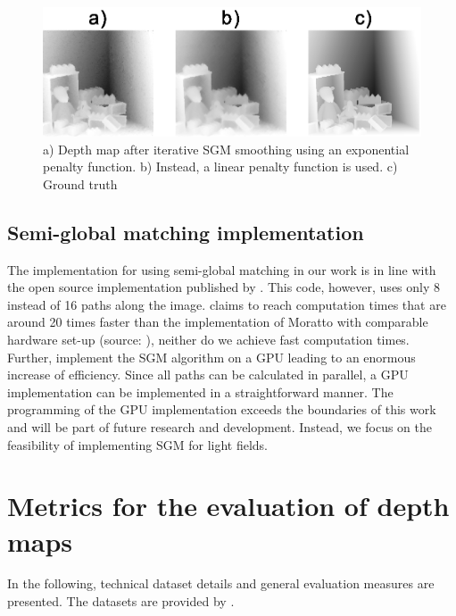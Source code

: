 \documentclass  [
  paper    = a4,
  BCOR     = 10mm,
  twoside,
  fontsize = 12pt,
  fleqn,
  toc      = bibnumbered,
  toc      = listofnumbered,
  numbers  = noendperiod,
  headings = normal,
  listof   = leveldown,
  version  = 3.03
]                                       {scrreprt}
\begin{document}
\begin{figure}[h!]
	\centering
	\includegraphics[width=1\linewidth]{images/linear_iteration}
	\caption[Linear cost function vs. exponential cost function results]{a) Depth map after iterative SGM smoothing using an exponential penalty function. b) Instead, a linear penalty function is used. c) Ground truth}
	\label{fig:lineariteration}
\end{figure}
\subsection{Semi-global matching implementation}
\label{sec:SGM_implement}
The implementation for using semi-global matching in our work is in line with the open source implementation published by \cite{sgmimplement}. This code, however, uses only 8 instead of 16 paths along the image. \cite{hirschmuller2005accurate} claims to reach computation times that are around 20 times faster than the implementation of Moratto with comparable hardware set-up (source: \cite{sgmimplement}), neither do we achieve fast computation times. Further, \cite{ernst2008mutual} implement the SGM algorithm on a GPU leading to an enormous increase of efficiency. Since all paths can be calculated in parallel, a GPU implementation can be implemented in a straightforward manner. The programming of the GPU implementation exceeds the boundaries of this work and will be part of future research and development. Instead, we focus on the feasibility of implementing SGM for light fields.
\section{Metrics for the evaluation of depth maps}
In the following, technical dataset details and general evaluation measures are presented. The datasets are provided by \cite{honauer2016benchmark}.
\end{document}
